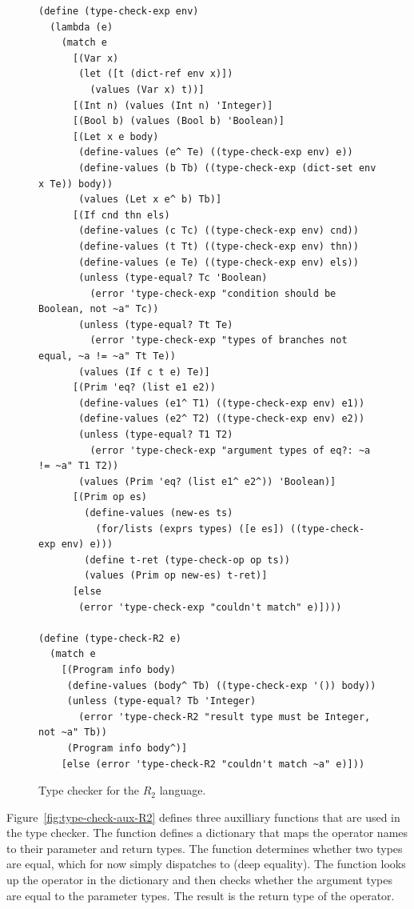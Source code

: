 \documentclass[11pt]{book}
\begin{document}
\begin{figure}[tbp]
\begin{lstlisting}[basicstyle=\ttfamily\footnotesize]
(define (type-check-exp env)
  (lambda (e)
    (match e
      [(Var x)
       (let ([t (dict-ref env x)])
         (values (Var x) t))]
      [(Int n) (values (Int n) 'Integer)]
      [(Bool b) (values (Bool b) 'Boolean)]
      [(Let x e body)
       (define-values (e^ Te) ((type-check-exp env) e))
       (define-values (b Tb) ((type-check-exp (dict-set env x Te)) body))
       (values (Let x e^ b) Tb)]
      [(If cnd thn els)
       (define-values (c Tc) ((type-check-exp env) cnd))
       (define-values (t Tt) ((type-check-exp env) thn))
       (define-values (e Te) ((type-check-exp env) els))
       (unless (type-equal? Tc 'Boolean)
         (error 'type-check-exp "condition should be Boolean, not ~a" Tc))
       (unless (type-equal? Tt Te)
         (error 'type-check-exp "types of branches not equal, ~a != ~a" Tt Te))
       (values (If c t e) Te)]
      [(Prim 'eq? (list e1 e2))
       (define-values (e1^ T1) ((type-check-exp env) e1))
       (define-values (e2^ T2) ((type-check-exp env) e2))
       (unless (type-equal? T1 T2)
         (error 'type-check-exp "argument types of eq?: ~a != ~a" T1 T2))
       (values (Prim 'eq? (list e1^ e2^)) 'Boolean)]
      [(Prim op es)
        (define-values (new-es ts)
          (for/lists (exprs types) ([e es]) ((type-check-exp env) e)))
        (define t-ret (type-check-op op ts))
        (values (Prim op new-es) t-ret)]
      [else
       (error 'type-check-exp "couldn't match" e)])))

(define (type-check-R2 e)
  (match e
    [(Program info body)
     (define-values (body^ Tb) ((type-check-exp '()) body))
     (unless (type-equal? Tb 'Integer)
       (error 'type-check-R2 "result type must be Integer, not ~a" Tb))
     (Program info body^)]
    [else (error 'type-check-R2 "couldn't match ~a" e)]))
\end{lstlisting}
\caption{Type checker for the $R_2$ language.}
\label{fig:type-check-R2}
\end{figure}


Figure~\ref{fig:type-check-aux-R2} defines three auxilliary functions
that are used in the type checker. The  function
defines a dictionary that maps the operator names to their parameter
and return types. The  function determines whether
two types are equal, which for now simply dispatches to 
(deep equality). The  function looks up the
operator in the  dictionary and then checks
whether the argument types are equal to the parameter types.  The
result is the return type of the operator.
\end{document}
